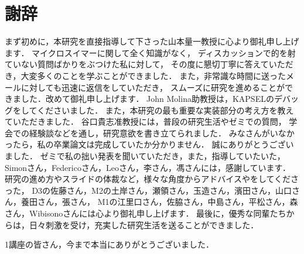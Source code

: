 \documentclass[11pt, a4j, dvipdfmx]{jarticle}
\begin{document}
\section*{謝辞}
まず初めに，本研究を直接指導して下さった山本量一教授に心より御礼申し上げます．
マイクロスイマーに関して全く知識がなく，
ディスカッションで的を射ていない質問ばかりをぶつけた私に対して，
その度に懇切丁寧に答えていただき，大変多くのことを学ぶことができました．
また，非常識な時間に送ったメールに対しても迅速に返信をしていただき，
スムーズに研究を進めることができました．改めて御礼申し上げます．
John Molina助教授は，KAPSELのデバッグをしてくださいました．
また，本研究の最も重要な実装部分の考え方を教えていただきました．
谷口貴志准教授には，普段の研究生活やゼミでの質問，
学会での経験談などを通し，研究意欲を書き立てられました．
みなさんがいなかったら，私の卒業論文は完成していたか分かりません．
誠にありがとうございました．
ゼミで私の拙い発表を聞いていただき，また，指導していたいた，
Simonさん，Federicoさん，Leoさん，李さん，馮さんには，感謝しています．
研究の進め方やスライドの体裁など，様々な角度からアドバイスやをしてくださった，
D3の佐藤さん，M2の土岸さん，瀬領さん，玉造さん，濱田さん，山口さん，養田さん，張さん，
M1の江里口さん，佐脇さん，中島さん，平松さん，森さん，Wibisonoさんには心より御礼申し上げます．
最後に，優秀な同輩たちからは，日々刺激を受け，充実した研究生活を送ることができました．
\par
1講座の皆さん，今まで本当にありがとうございました．
\end{document}
